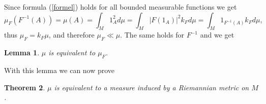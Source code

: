 \documentclass[12pt]{article}
\def\ch{{\cal H}}
\newtheorem{thm}{Theorem}[subsection]
\newtheorem{lemma}[thm]{Lemma}
\begin{document}





Since formula (\ref{formel}) holds for all bounded measurable functions we get
$$\mu_F (F^{-1}(A)) =\mu (A)=\int_M 1_A^2 d\mu =  \int_M |F(1_A)|^2 k_F d\mu = \int_M 1_{F^{-1}(A)} k_F d\mu , $$
thus $\mu_F=k_F \mu$, and therefore $\mu_F \ll  \mu $. The same holds for $F^{-1}$ and we get

\begin{lemma} \label{aekvi}
$\mu$ is equivalent to $\mu_F$.
\end{lemma}

With this lemma we can now prove

\begin{thm}
$\mu$ is equivalent to a measure induced by a Riemannian metric on $M$.
\end{thm}
\end{document}
